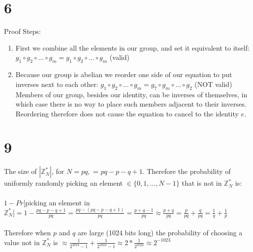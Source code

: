 \documentclass[]{article}
\begin{document}
\section{6}
Proof Steps:
\begin{enumerate}
	\item First we combine all the elements in our group, and set it equivalent to itself:
	\subitem $g_1 \circ g_2 \circ ... \circ g_m = g_1 \circ g_2 \circ ... \circ g_m$ (valid)
	\item Because our group is abelian we reorder one side of our equation to put inverses next to each other:
	\subitem $g_1 \circ g_2 \circ ... \circ g_m = g_7 \circ g_m \circ ... \circ g_2$ (NOT valid)
	\subitem Members of our group, besides our identity, can be inverses of themselves, in which case there is no way to place such members adjacent to their inverses. Reordering therefore does not cause the equation to cancel to the identity $e$.
\end{enumerate}
\section{9}
The size of $|\mathbb{Z}^*_N|$, for $N = pq,$ = $pq - p - q + 1$. Therefore the probability of uniformly randomly picking an element $\in \{0, 1, ..., N -1\}$ that is not in $\mathbb{Z}^*_N$ is:
\\\\
$1 - Pr[$picking an element in $\mathbb{Z}^*_N] = 1 - \frac{pq - p - q + 1}{pq} = \frac{pq - (pq - p - q + 1)}{pq} = \frac{p + q - 1}{pq} \approx \frac{p + q}{pq} = \frac{p}{pq} + \frac{q}{pq} = \frac{1}{q} + \frac{1}{p}$
\\\\
Therefore when $p$ and $q$ are large (1024 bits long) the probability of choosing a value not in $\mathbb{Z}^*_N$ is $\approx \frac{1}{2^{1024} - 1} + \frac{1}{2^{1024} - 1} \approx 2 * \frac{1}{2^{1024}} \approx 2^{-1023}$
\end{document}
